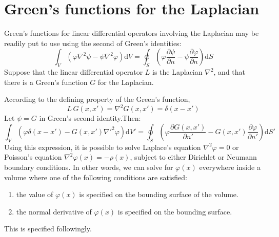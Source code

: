 \documentclass[a4paper]{article}
\begin{document}
\part{Green's functions for the Laplacian}
Green's functions for linear differential operators involving the Laplacian may be readily put to use using the second of Green's identities:
\begin{equation}
\int_V \left(\varphi\nabla^{2}\psi-\psi\nabla^{2}\varphi\right)\mathrm{d}V=\oint_S\left(\varphi\frac{\partial\psi}{\partial n}-\psi\frac{\partial \varphi}{\partial n}\right)\mathrm{d}S
\end{equation}
Suppose that the linear differential operator $L$ is the Laplacian $\nabla^2$, and that there is a  Green's function $G$ for the Laplacian.

According to the defining property of the Green's function,
\begin{equation}
L\,G(x,x')=\nabla^2 G(x,x')=\delta(x-x')
\end{equation}
Let $\psi=G$ in Green's second identity.Then:
\begin{equation}
\int_V \left(\varphi\delta(x-x')-G(x,x')\nabla'^2\varphi\right)\mathrm{d}V'=\oint_S\left(\varphi\frac{\partial G(x,x')}{\partial n'}-G(x,x')\frac{\partial \varphi}{\partial n'}\right)\mathrm{d}S'
\end{equation}
Using this expression, it is possible to solve Laplace's equation $\nabla^2\varphi=0$ or Poisson's equation $\nabla^2\varphi(x)=-\rho(x)$, subject to either Dirichlet or Neumann boundary conditions. In other words, we can solve for $\varphi(x)$ everywhere inside a volume where one of the following conditions are satisfied:
\begin{enumerate}
\item the value of $\varphi(x)$ is specified on the bounding surface of the volume.
\item the normal derivative of $\varphi(x)$ is specified on the bounding surface.
\end{enumerate}
This is specified followingly.
\end{document}
